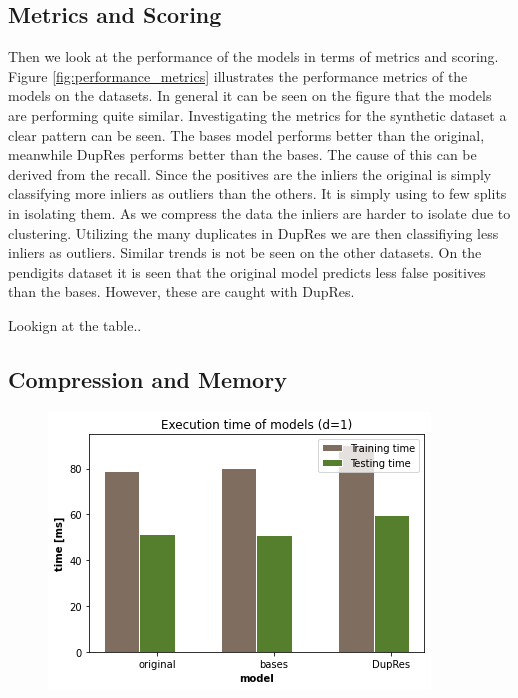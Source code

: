 \subsection{Metrics and Scoring}
Then we look at the performance of the models in terms of metrics and scoring. Figure \ref{fig:performance_metrics} illustrates the performance metrics of the models on the datasets. In general it can be seen on the figure that the models are performing quite similar. Investigating the metrics for the synthetic dataset a clear pattern can be seen. The bases model performs better than the original, meanwhile DupRes performs better than the bases. The cause of this can be derived from the recall. Since the positives are the inliers the original is simply classifying more inliers as outliers than the others. It is simply using to few splits in isolating them. As we compress the data the inliers are harder to isolate due to clustering. Utilizing the many duplicates in DupRes we are then classifiying less inliers as outliers. Similar trends is not be seen on the other datasets. On the pendigits dataset it is seen that the original model predicts less false positives than the bases. However, these are caught with DupRes.

Lookign at the table..

\subsection{Compression and Memory}

\begin{figure}
  \centering
  \includegraphics[width=0.8\linewidth]{images/performance_time.png}
  \caption{}
  \label{fig:performance_time}
\end{figure}

